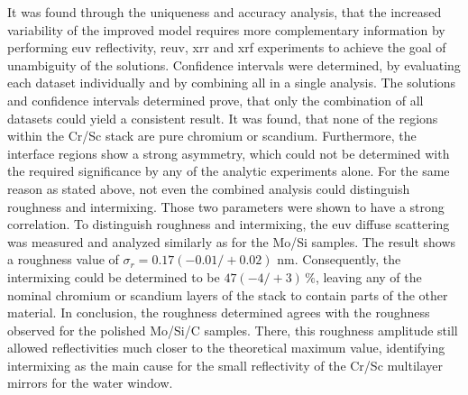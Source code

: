 It was found through the uniqueness and accuracy analysis, that the increased variability of the improved model requires more complementary information by performing \gls{euv} reflectivity, \gls{reuv}, \gls{xrr} and \gls{xrf} experiments to achieve the goal of unambiguity of the solutions. Confidence intervals were determined, by evaluating each dataset individually and by combining all in a single analysis. The solutions and confidence intervals determined prove, that only the combination of all datasets could yield a consistent result. It was found, that none of the regions within the Cr/Sc stack are pure chromium or scandium. Furthermore, the interface regions show a strong asymmetry, which could not be determined with the required significance by any of the analytic experiments alone. For the same reason as stated above, not even the combined analysis could distinguish roughness and intermixing. Those two parameters were shown to have a strong correlation. To distinguish roughness and intermixing, the \gls{euv} diffuse scattering was measured and analyzed similarly as for the Mo/Si samples. The result shows a roughness value of $\sigma_r = 0.17  (-0.01/+0.02)$ nm. Consequently, the intermixing could be determined to be $47 (-4/+3)\, \%$, leaving any of the nominal chromium or scandium layers of the stack to contain parts of the other material. In conclusion, the roughness determined agrees with the roughness observed for the polished Mo/Si/C samples. There, this roughness amplitude still allowed reflectivities much closer to the theoretical maximum value, identifying intermixing as the main cause for the small reflectivity of the Cr/Sc multilayer mirrors for the water window.

